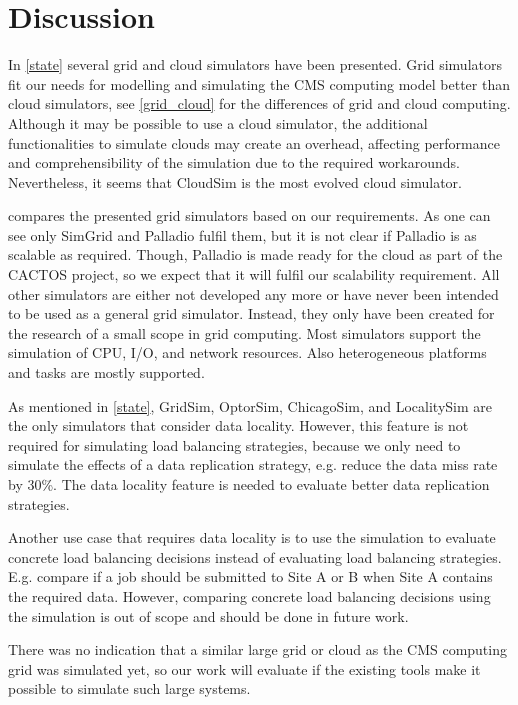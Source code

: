 \chapter{Discussion}
\label{dis}
In \cref{state} several grid and cloud simulators have been presented. Grid simulators fit our needs for modelling and simulating the CMS computing model better than cloud simulators, see \cref{grid_cloud} for the differences of grid and cloud computing. Although it may be possible to use a cloud simulator, the additional functionalities to simulate clouds may create an overhead, affecting performance and comprehensibility of the simulation due to the required workarounds. Nevertheless, it seems that CloudSim is the most evolved cloud simulator.

 compares the presented grid simulators based on our requirements. As one can see only SimGrid and Palladio fulfil them, but it is not clear if Palladio is as scalable as required. Though, Palladio is made ready for the cloud as part of the CACTOS project, so we expect that it will fulfil our scalability requirement. All other simulators are either not developed any more or have never been intended to be used as a general grid simulator. Instead, they only have been created for the research of a small scope in grid computing. Most simulators support the simulation of CPU, I/O, and network resources. Also heterogeneous platforms and tasks are mostly supported.

As mentioned in \cref{state}, GridSim, OptorSim, ChicagoSim, and LocalitySim are the only simulators that consider data locality. However, this feature is not required for simulating load balancing strategies, because we only need to simulate the effects of a data replication strategy, e.g. reduce the data miss rate by 30\%. The data locality feature is needed to evaluate better data replication strategies.

Another use case that requires data locality is to use the simulation to evaluate concrete load balancing decisions instead of evaluating load balancing strategies. E.g. compare if a job should be submitted to Site A or B when Site A contains the required data. However, comparing concrete load balancing decisions using the simulation is out of scope and should be done in future work.

There was no indication that a similar large grid or cloud as the CMS computing grid was simulated yet, so our work will evaluate if the existing tools make it possible to simulate such large systems.

